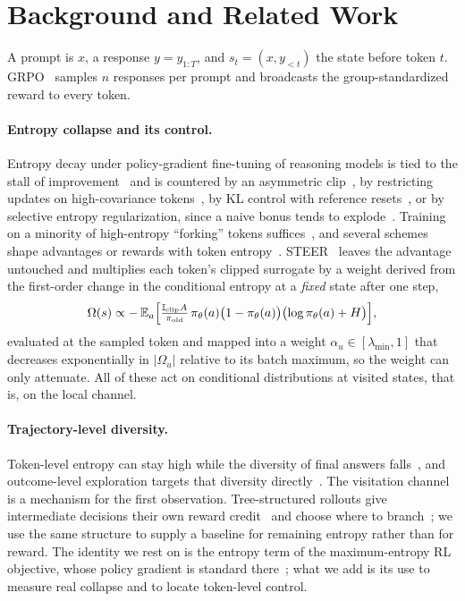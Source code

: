 \documentclass[runningheads]{llncs}
\newcommand{\Om}{\Omega}
\newcommand{\E}{\mathbb{E}}
\newcommand{\pit}{\pi_{\theta}}
\begin{document}
\section{Background and Related Work}
\label{sec:prelim}

A prompt is $x$, a response $y = y_{1:T}$, and $s_t = (x, y_{<t})$ the state before
token $t$. GRPO~\cite{shao2024deepseekmath} samples $n$ responses per prompt and
broadcasts the group-standardized reward to every token.

\paragraph{Entropy collapse and its control.} Entropy decay under policy-gradient
fine-tuning of reasoning models is tied to the stall of improvement~\cite{cui2025bentropy}
and is countered by an asymmetric clip~\cite{yu2025dapo}, by restricting updates on
high-covariance tokens~\cite{cui2025bentropy}, by KL control with reference
resets~\cite{liu2025bprorl}, or by selective entropy regularization, since a naive bonus
tends to explode~\cite{rethinkingentropyreg}. Training on a minority of high-entropy
``forking'' tokens suffices~\cite{wang2025dbeyond}, and several schemes shape advantages
or rewards with token entropy~\cite{cheng2025reasoning,tan2025gtpo,zhang2025dedge}.
STEER~\cite{steer} leaves the advantage untouched and multiplies each token's
clipped surrogate by a weight derived from the first-order change in the conditional
entropy at a \emph{fixed} state after one step,
\begin{equation}
\Om(s) \propto -\,\E_{a}\Bigl[\tfrac{\mathbb{I}_{\mathrm{clip}} A}{\pi_{\mathrm{old}}}\,
  \pit(a)\bigl(1-\pit(a)\bigr)\bigl(\log \pit(a) + H\bigr)\Bigr],
\label{eq:omega}
\end{equation}
evaluated at the sampled token and mapped into a weight $\alpha_u \in
[\lambda_{\min}, 1]$ that decreases exponentially in $|\Om_u|$ relative to its batch
maximum, so the weight can only attenuate. All of these act on conditional distributions at
visited states, that is, on the local channel.

\paragraph{Trajectory-level diversity.} Token-level entropy can stay high while the
diversity of final answers falls~\cite{wu2025ainvisible}, and outcome-level exploration
targets that diversity directly~\cite{song2025outcome}. The visitation channel is a
mechanism for the first observation. Tree-structured rollouts give intermediate
decisions their own reward credit~\cite{hou2025treerl,yang2025treerpo,cao2026treeadv}
and choose where to branch~\cite{cao2026treeadv,khomich2026epig}; we use the same
structure to supply a baseline for remaining entropy rather than for reward. The
identity we rest on is the entropy term of the maximum-entropy RL objective, whose
policy gradient is standard there~\cite{schulman2017equivalence,levine2018reinforcement};
what we add is its use to measure real collapse and to locate token-level control.
\end{document}
